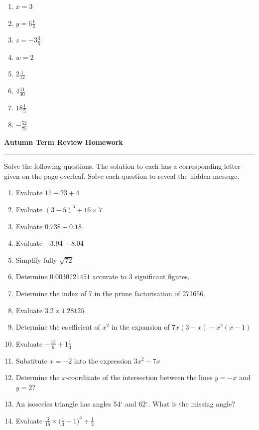 \documentclass[12pt]{article}
\begin{document}
\medskip

\begin{enumerate}
    \item \(x=3\)
    \item \(y=6\frac{1}{2}\)
    \item \(z=-3\frac{3}{5}\)
    \item \(w=2\)
    \item \(2\frac{1}{12}\)
    \item \(4\frac{11}{30}\)
    \item \(18\frac{1}{5}\)
    \item \(-\frac{52}{75}\)
\end{enumerate}

\newpage

\noindent \textbf{Autumn Term Review Homework}

\medskip

\hrule

\medskip

\noindent Solve the following questions. The solution to each has a corresponding letter given on the page overleaf. Solve each question to reveal the hidden message.

\begin{enumerate}
    \item Evaluate \(17-23+4\)
    \item Evaluate \((3-5)^3\div 16 \times 7\)
    \item Evaluate \(0.738 \div 0.18\)
    \item Evaluate \(-3.94+8.04\)
    \item Simplify fully \(\sqrt{72}\)
    \item Determine \(0.0030721451\) accurate to 3 significant figures.
    \item Determine the index of 7 in the prime factorisation of 271656.
    \item Evaluate \(3.2 \times 1.28125\)
    \item Determine the coefficient of \(x^2\) in the expansion of \(7x(3-x)-x^2(x-1)\) 
    \item Evaluate \(-\frac{13}{9}+1\frac{1}{3}\)
    \item Substitute \(x=-2\) into the expression \(3x^2-7x\)
    \item Determine the \(x\)-coordinate of the intersection between the lines \(y=-x\) and \(y=2\)?
    \item An isosceles triangle has angles 54\(^\circ\) and 62\(^\circ\). What is the missing angle?
    \item Evaluate \(\frac{3}{16} \times \big(\frac{1}{3}-1 \big)^3 \div \frac{1}{2}\)
\end{enumerate}
\end{document}
